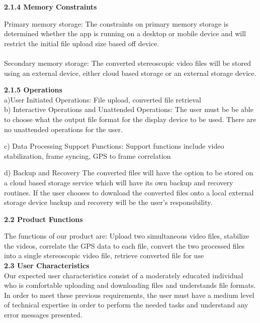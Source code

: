 \documentclass[10pt,draftclsnofoot,onecolumn]{IEEEtran}
\begin{document}
\vspace{5mm}

{\Medium\textbf{2.1.4 Memory Constraints}} \\
\vspace{5mm}

Primary memory storage: The constraints on primary memory storage is determined whether the app is running on a desktop or mobile device and will restrict the initial file upload size based off device. \\\vspace{2mm}
\\
			Secondary memory storage: The converted stereoscopic video files will be stored using an external device, either cloud based storage or an external storage device.

\vspace{5mm}

{\Medium\textbf{2.1.5 Operations}} \\
\vspace{5mm}
a)User Initiated Operations: File upload, converted file retrieval\\
\vspace{2mm}
b) Interactive Operations and Unattended Operations: The user must be be able to choose what the output file format for the display device to be used. There are no unattended operations for the user.\\
\vspace{2mm}

c) Data Processing Support Functions: Support functions include video stabilization, frame syncing, GPS to frame correlation
	
\vspace{2mm}

d) Backup and Recovery 
	The converted files will have the option to be stored on a cloud based storage service which will have its own backup and recovery routines. If the user chooses to download the converted files onto a local external storage device backup and recovery will be the user’s responsibility.
	
	
	\vspace{5mm}
	
	{\Medium\textbf{2.2 Product Functions}} \\
	\vspace{5mm}

	The functions of our product are: Upload two simultaneous video files, stabilize the videos, correlate the GPS data to each file, convert the two processed files into a single stereoscopic video file, retrieve converted file for use \\
		\vspace{5mm}
	{\Medium\textbf{2.3 User Characteristics}} \\
		\vspace{5mm}
Our expected user characteristics consist of a moderately educated individual who is comfortable uploading and downloading files and understands file formats. In order to meet these previous requirements, the user must have a medium level of technical expertise in order to perform the needed tasks and understand any error messages presented. \\
	 
\end{document}
